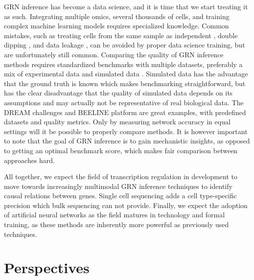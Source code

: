 GRN inference has become a data science, and it is time that we start treating it as such. Integrating multiple omics, several thousands of cells, and training complex machine learning models requires specialized knowledge. Common mistakes, such as treating cells from the same sample as independent \cite{Zimmerman_2021}, double dipping \cite{https://doi.org/10.48550/arxiv.2012.02936}, and data leakage \cite{Schreiber_2020}, can be avoided by proper data science training, but are unfortunately still common. Comparing the quality of GRN inference methods requires standardized benchmarks with multiple datasets, preferably a mix of experimental data and simulated data \cite{Dibaeinia_2020,Li_2022,Ventre_2022}. Simulated data has the advantage that the ground truth is known which makes benchmarking straightforward, but has the clear disadvantage that the quality of simulated data depends on its assumptions and may actually not be representative of real biological data. The DREAM challenges \cite{Cokelaer_2016,dream} and BEELINE platform \cite{Pratapa_2020} are great examples, with predefined datasets and quality metrics. Only by measuring network accuracy in equal settings will it be possible to properly compare methods. It is however important to note that the goal of GRN inference is to gain mechanistic insights, as opposed to getting an optimal benchmark score, which makes fair comparison between approaches hard.

All together, we expect the field of transcription regulation in development to move towards increasingly multimodal GRN inference techniques to identify causal relations between genes. Single cell sequencing adds a cell type-specific precision which bulk sequencing can not provide. Finally, we expect the adoption of artificial neural networks as the field matures in technology and formal training, as these methods are inherently more powerful as previously used techniques.

\section{Perspectives}


